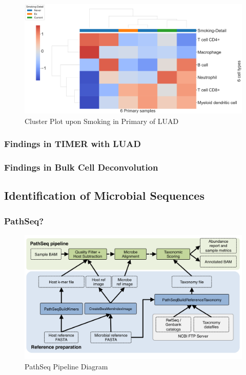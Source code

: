 \documentclass{beamer}
\begin{document}
\begin{frame}[allowframebreaks]
        \begin{figure}
            \includegraphics[width=0.9 \linewidth]{figures/TIMER/Clustermap/STAR.FPKM.ADC.Smoking/TIMER-Primary.pdf}
            \caption{Cluster Plot upon Smoking in Primary of LUAD}
        \end{figure}
    \end{frame}

    \begin{frame}[allowframebreaks]
        \frametitle{Findings in TIMER with LUAD}
    \end{frame}

    \begin{frame}
        \frametitle{Findings in Bulk Cell Deconvolution}
    \end{frame}

    \subsection{Identification of Microbial Sequences}
    \begin{frame}
        \frametitle{PathSeq?}

        \begin{figure}
            \includegraphics[width=0.8 \linewidth]{figures/Workflow/PathSeq.png}
            \caption{PathSeq Pipeline Diagram \protect\cite{pathseq1, pathseq2}}
        \end{figure}
    \end{frame}
\end{document}
